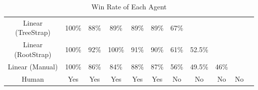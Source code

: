 \documentclass[a4paper,12pt,table]{article}
\begin{document}
\begin{table}[H]
{\begin{tabular}{|c|cccccccccc}
    Linear (TreeStrap) & \multicolumn{1}{c|}{100\%}                    & \multicolumn{1}{c|}{88\%}                       & \multicolumn{1}{c|}{89\%}                       & \multicolumn{1}{c|}{89\%}                       & \multicolumn{1}{c|}{89\%}                       & \multicolumn{1}{c|}{67\%}                           & \cellcolor[HTML]{000000}                        & \cellcolor[HTML]{000000}                        & \cellcolor[HTML]{000000}                        & \cellcolor[HTML]{000000}                        \\ \cline{1-8}
    Linear (RootStrap) & \multicolumn{1}{c|}{100\%}                    & \multicolumn{1}{c|}{92\%}                       & \multicolumn{1}{c|}{100\%}                      & \multicolumn{1}{c|}{91\%}                       & \multicolumn{1}{c|}{90\%}                       & \multicolumn{1}{c|}{61\%}                           & \multicolumn{1}{c|}{52.5\%}                           & \cellcolor[HTML]{000000}                        & \cellcolor[HTML]{000000}                        & \cellcolor[HTML]{000000}                        \\ \cline{1-9}
    Linear (Manual) & \multicolumn{1}{c|}{100\%}                       & \multicolumn{1}{c|}{86\%}                        & \multicolumn{1}{c|}{84\%}                      & \multicolumn{1}{c|}{88\%}                       & \multicolumn{1}{c|}{87\%}                       & \multicolumn{1}{c|}{56\%}                           & \multicolumn{1}{c|}{49.5\%}                     & \multicolumn{1}{c|}{46\%}                        & \cellcolor[HTML]{000000}                        & \cellcolor[HTML]{000000}                        \\ \cline{1-10}
    Human          & \multicolumn{1}{c|}{Yes}                      & \multicolumn{1}{c|}{Yes}                      & \multicolumn{1}{c|}{Yes}                           & \multicolumn{1}{c|}{Yes}                      & \multicolumn{1}{c|}{Yes}                           & \multicolumn{1}{c|}{No}                           & \multicolumn{1}{c|}{No}                           & \multicolumn{1}{c|}{No}                           & \multicolumn{1}{c|}{No}                           & \cellcolor[HTML]{000000}                        \\ \cline{1-10}
    \end{tabular}
    }
    \caption{Win Rate of Each Agent}
    \label{table:}
\end{table}
\end{document}
